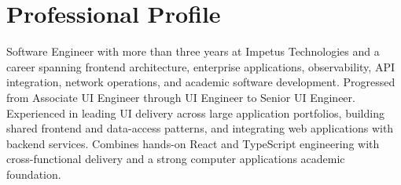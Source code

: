 \section{Professional Profile}
Software Engineer with more than three years at Impetus Technologies and a
career spanning frontend architecture, enterprise applications, observability,
API integration, network operations, and academic software development.
Progressed from Associate UI Engineer through UI Engineer to Senior UI
Engineer. Experienced in leading UI delivery across large application
portfolios, building shared frontend and data-access patterns, and integrating
web applications with backend services. Combines hands-on React and TypeScript
engineering with cross-functional delivery and a strong computer applications
academic foundation.

